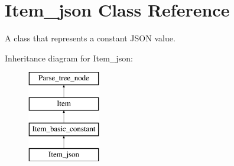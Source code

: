\hypertarget{classItem__json}{}\section{Item\+\_\+json Class Reference}
\label{classItem__json}


A class that represents a constant J\+S\+ON value.  


Inheritance diagram for Item\+\_\+json\+:\begin{figure}[H]
\begin{center}
\leavevmode
\includegraphics[height=4.000000cm]{classItem__json}
\end{center}
\end{figure}
